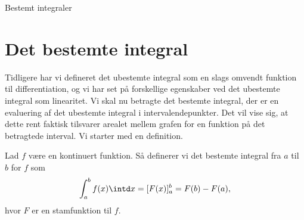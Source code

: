 
\begin{center}
\Huge
Bestemt integraler
\end{center}

\section*{Det bestemte integral}
Tidligere har vi defineret det ubestemte integral som en slags omvendt funktion til differentiation, og vi har set på forskellige egenskaber ved det ubestemte integral som linearitet. Vi skal nu betragte det bestemte integral, der er en evaluering af det ubestemte integral i intervalendepunkter. Det vil vise sig, at dette rent faktisk tilsvarer arealet mellem grafen for en funktion på det betragtede interval. Vi starter med en definition.
\begin{defn}
Lad $f$ være en kontinuert funktion. Så definerer vi det bestemte integral fra $a$ til $b$ for $f$ som
\begin{align*}
\int_a^bf(x) \intd x = [F(x)]_a^b = F(b)-F(a),
\end{align*}
hvor $F$ er en stamfunktion til $f$. 
\end{defn}

